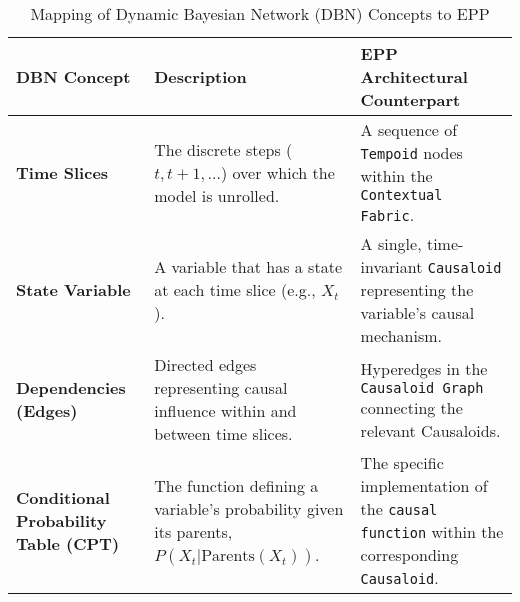 \begin{table}[h!]
    \centering
    \caption{Mapping of Dynamic Bayesian Network (DBN) Concepts to EPP}
    \label{tab:dbn_mapping}
    \begin{tabular}{|l|p{5.5cm}|p{5.5cm}|}
        \hline
        \textbf{DBN Concept} & \textbf{Description} & \textbf{EPP Architectural Counterpart} \\
        \hline
        \textbf{Time Slices} &
        The discrete steps ($t, t+1, \dots$) over which the model is unrolled. &
        A sequence of \texttt{Tempoid} nodes within the \texttt{Contextual Fabric}. \\
        \hline
        \textbf{State Variable} &
        A variable that has a state at each time slice (e.g., $X_t$). &
        A single, time-invariant \texttt{Causaloid} representing the variable's causal mechanism. \\
        \hline
        \textbf{Dependencies (Edges)} &
        Directed edges representing causal influence within and between time slices. &
        Hyperedges in the \texttt{Causaloid Graph} connecting the relevant Causaloids. \\
        \hline
        \textbf{Conditional Probability Table (CPT)} &
        The function defining a variable's probability given its parents, $P(X_t | \text{Parents}(X_t))$. &
        The specific implementation of the \texttt{causal function} within the corresponding \texttt{Causaloid}. \\
        \hline
    \end{tabular}
\end{table}



\newpage
